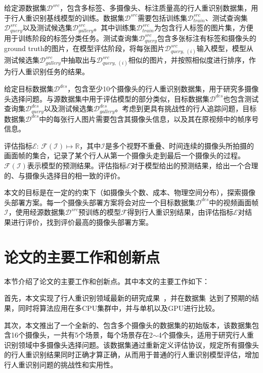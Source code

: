 给定源数据集$\mathcal{D}^{src}$，包含多标签、多摄像头、标注质量高的行人重识别数据集，用于行人重识别基线模型的训练。数据集$\mathcal{D}^{src}$需要包括训练集$\mathcal{D}_{train}^{src}$、测试查询集$\mathcal{D}_{query}^{src}$以及测试候选集$\mathcal{D}_{gallery}^{src}$。其中训练集$\mathcal{D}_{train}^{src}$为包含行人标签的图片集，方便用于训练阶段的标签分类任务。测试查询集$\mathcal{D}_{query}^{src}$包含多张标注有标签和摄像头的ground truth的图片，在模型评估阶段，将每张图片$\mathcal{D}_{query,\,(i)}^{src}$输入模型，模型从测试候选集$\mathcal{D}_{gallery}^{src}$中抽取出与$\mathcal{D}_{query,\,(i)}^{src}$相似的图片，并按照相似度进行排序，作为行人重识别任务的结果。

给定目标数据集$\mathcal{D}^{des}$，包含至少10个摄像头的行人重识别数据集，用于研究多摄像头选择问题。与源数据集中用于评估模型的部分类似，目标数据集$\mathcal{D}^{des}$也包含测试查询集$\mathcal{D}_{query}^{des}$以及测试候选集$\mathcal{D}_{gallery}^{des}$。考虑到更具有挑战性的行人追踪问题，目标数据集$\mathcal{D}^{des}$中的每张行人图片需要包含其摄像头信息，以及其在原视频中的帧序号信息。

评估指标$\mathcal{E}:\,\mathcal{F}(\mathcal{I})\mapsto\mathbb{R}$，其中$\mathcal{I}$是多个视野不重叠、时间连续的摄像头所拍摄的画面帧的集合，记录了某个行人从第一个摄像头走到最后一个摄像头的过程。$\mathcal{F}(\mathcal{I})$表示模型的预测结果。评估指标$\mathcal{E}$对于模型给出的预测结果，给出一个合理的、与摄像头选择目的相一致的评价。

本文的目标是在一定的约束下（如摄像头个数、成本、物理空间分布），探索摄像头部署方案。每一个摄像头部署方案将会对应一个目标数据集$\mathcal{D}^{des}$中的视频画面帧$\mathcal{I}$，使用经源数据集$\mathcal{D}^{src}$预训练的模型$\mathcal{F}$得到行人重识别结果，由评估指标$\mathcal{E}$对结果进行评价，找到评价最高的摄像头部署方案。

\section{论文的主要工作和创新点}

本节介绍了论文的主要工作和创新点。其中本文的主要工作如下：

首先，本文实现了行人重识别领域最新的研究成果~\cite{sun2017beyond}，并在数据集~\cite{zheng2015scalable}达到了预期的结果，同时将算法应用在多CPU集群中，并与单机以及GPU进行比较。

其次，本文推出了一个全新的、包含多个摄像头的数据集的初始版本，该数据集包含16个摄像头，一共有5个场景，每个场景存在2$\sim$4个摄像头，适用于研究行人重识别领域中多摄像头选择问题。该数据集通过重新定义评估协议，规定所有摄像头的行人重识别结果同时正确才算正确，从而用于普通的行人重识别模型评估，增加行人重识别问题的挑战性和实用性。

